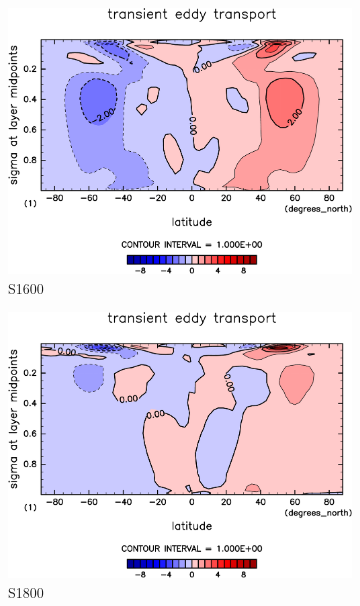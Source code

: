 \documentclass[body]{subfiles}
\begin{document}
\begin{figure}[t]
	\begin{subfigure}{.4\textwidth}
		\centering
		\includegraphics[width=\columnwidth]{S1600/MeriHeatTransTest@dryStatEn_TE,time=3650:4015-crop-rotate.pdf}
		\caption{S1600}\label{乾燥静的エネルギー移動性擾乱S1600}
	\end{subfigure}
	\begin{subfigure}{.4\textwidth}
		\centering
		\includegraphics[width=\columnwidth]{S1800/MeriHeatTransTest@dryStatEn_TE,time=3650:4015-crop-rotate.pdf}
		\caption{S1800}\label{乾燥静的エネルギー移動性擾乱S1800}
	\end{subfigure}
	\begin{subfigure}{.4\textwidth}

\end{subfigure}
\end{figure}
\end{document}
